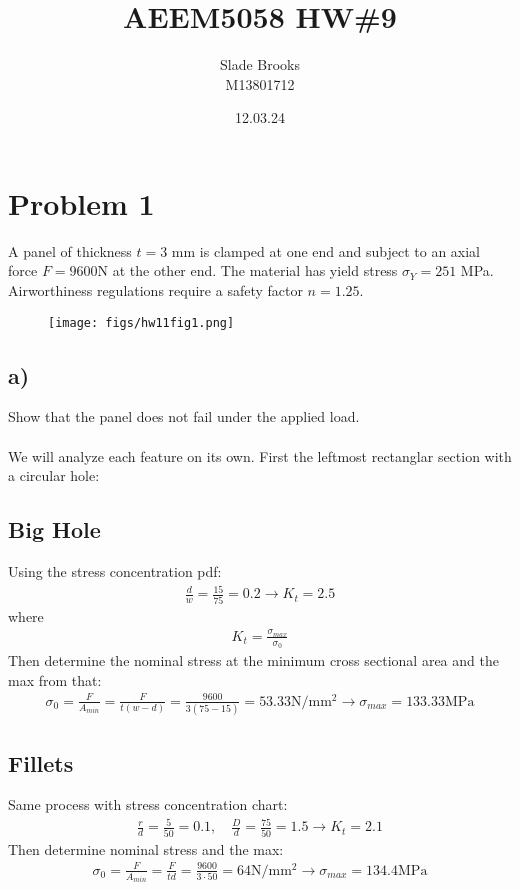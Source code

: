 \documentclass[12 pt]{article}
\title{AEEM5058 HW\#9}
\date{12.03.24}
\author{Slade Brooks \\ M13801712}
\begin{document}
\maketitle

\section*{Problem 1}
A panel of thickness $t = 3$ mm is clamped at one end and subject to an axial force $F= 9600$N at
the other end. The material has yield stress $\sigma_Y=251$ MPa. Airworthiness regulations require a
safety factor $n=1.25$.
\begin{figure}[H]
    \centering
    \texttt{[image: figs/hw11fig1.png]}
\end{figure}

\pagebreak
\subsection*{a)}
Show that the panel does not fail under the applied load. \\ \\
We will analyze each feature on its own. First the leftmost rectanglar section with a circular hole:

\subsection*{Big Hole}
Using the stress concentration pdf:
\begin{align*}
    \frac{d}{w}=\frac{15}{75}=0.2 \rightarrow K_t=2.5
\end{align*}
where
\begin{align*}
    K_t=\frac{\sigma_{max}}{\sigma_0}
\end{align*}
Then determine the nominal stress at the minimum cross sectional area and the max from that:
\begin{align*}
    \sigma_0=\frac{F}{A_{min}}=\frac{F}{t(w-d)}=\frac{9600}{3(75-15)}=53.33\text{N/mm$^2$} \rightarrow
    \sigma_{max} = 133.33\text{MPa}
\end{align*}

\subsection*{Fillets}
Same process with stress concentration chart:
\begin{align*}
    \frac{r}{d}=\frac{5}{50}=0.1,\quad \frac{D}{d}=\frac{75}{50}=1.5 \rightarrow K_t=2.1
\end{align*}
Then determine nominal stress and the max:
\begin{align*}
    \sigma_0=\frac{F}{A_{min}}=\frac{F}{td}=\frac{9600}{3\cdot50}=64\text{N/mm$^2$} \rightarrow
    \sigma_{max}= 134.4\text{MPa}
\end{align*}
\end{document}
